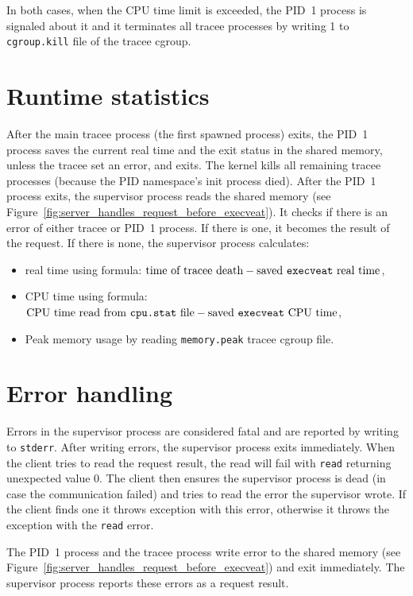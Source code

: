 \documentclass[en]{pracamgr}
\begin{document}
In both cases, when the CPU time limit is exceeded, the PID~1 process is signaled about it and it terminates all tracee processes by writing 1 to \texttt{cgroup.kill} file of the tracee cgroup.

\section{Runtime statistics}

After the main tracee process (the first spawned process) exits, the PID~1 process saves the current real time and the exit status in the shared memory, unless the tracee set an error, and exits. The kernel kills all remaining tracee processes (because the PID namespace's init process died). After the PID~1 process exits, the supervisor process reads the shared memory (see Figure~\ref{fig:server_handles_request_before_execveat}). It checks if there is an error of either tracee or PID~1 process. If there is one, it becomes the result of the request. If there is none, the supervisor process calculates:
\begin{itemize}
    \item real time using formula: $\text{time of tracee death} - \text{saved \texttt{execveat} real time}$,
    \item CPU time using formula: $\text{CPU time read from \texttt{cpu.stat} file} - \text{saved \texttt{execveat} CPU time}$,
    \item Peak memory usage by reading \texttt{memory.peak} tracee cgroup file.
\end{itemize}

\section{Error handling}

Errors in the supervisor process are considered fatal and are reported by writing to \texttt{stderr}. After writing errors, the supervisor process exits immediately. When the client tries to read the request result, the read will fail with \texttt{read} returning unexpected value 0. The client then ensures the supervisor process is dead (in case the communication failed) and tries to read the error the supervisor wrote. If the client finds one it throws exception with this error, otherwise it throws the exception with the \texttt{read} error.

The PID~1 process and the tracee process write error to the shared memory (see Figure~\ref{fig:server_handles_request_before_execveat}) and exit immediately. The supervisor process reports these errors as a request result.
\end{document}
